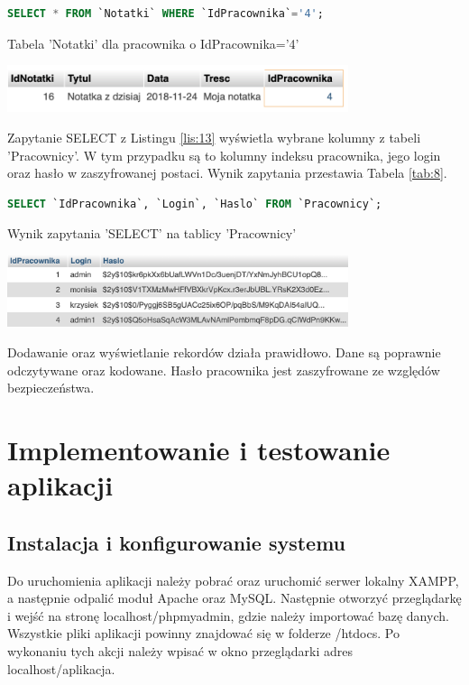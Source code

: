 \documentclass[eng,printmode,openany,oneside]{mgr}
\begin{document}
\begin{lstlisting}[caption={Wyświetlanie tabeli 'Notatki' dla pracownika o indeksie 4}, language=SQL, label={lis:12}]
SELECT * FROM `Notatki` WHERE `IdPracownika`='4';
\end{lstlisting}	
	
	\begin{table}[H]
		\centering
		\caption{Tabela 'Notatki' dla pracownika o IdPracownika='4'}
		\includegraphics[width=0.75\textwidth]{baza_select_id_tabela}
		\label{tab:7}
	\end{table}
	
Zapytanie SELECT z Listingu \ref{lis:13} wyświetla wybrane kolumny z tabeli 'Pracownicy'. W tym przypadku są to kolumny indeksu pracownika, jego login oraz hasło w zaszyfrowanej postaci. Wynik zapytania przestawia Tabela \ref{tab:8}.
	
	
\begin{lstlisting}[caption={Wyświetlanie wybranych kolumn z tabeli 'Pracownicy'}, language=SQL, label={lis:13}]
SELECT `IdPracownika`, `Login`, `Haslo` FROM `Pracownicy`;
\end{lstlisting}

		
	\begin{table}[H]
		\centering
		\caption{Wynik zapytania 'SELECT' na tablicy 'Pracownicy'}
		\includegraphics[width=0.75\textwidth]{baza_select_wybrane_tabela}
		\label{tab:8}
	\end{table}
	
Dodawanie oraz wyświetlanie rekordów działa prawidłowo. Dane są poprawnie odczytywane oraz kodowane. Hasło pracownika jest zaszyfrowane ze względów bezpieczeństwa.


\chapter{Implementowanie i testowanie aplikacji}

\section{Instalacja i konfigurowanie systemu}
Do uruchomienia aplikacji należy pobrać oraz uruchomić serwer lokalny XAMPP, a następnie odpalić moduł Apache oraz MySQL. Następnie otworzyć przeglądarkę i wejść na stronę localhost/phpmyadmin, gdzie należy importować bazę danych. Wszystkie pliki aplikacji powinny znajdować się w folderze /htdocs. Po wykonaniu tych akcji należy wpisać w okno przeglądarki adres localhost/aplikacja.
\end{document}
